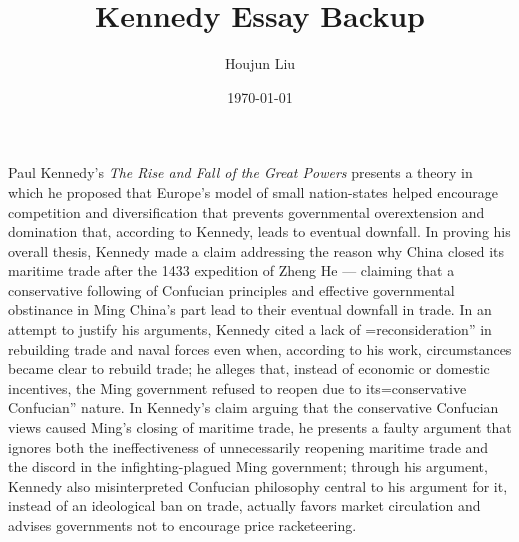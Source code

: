 \documentclass[letterpaper]{article}
\author{Houjun Liu}
\date{\today}
\title{Kennedy Essay Backup}
\renewcommand{\tableofcontents}{}
\begin{document}
\tableofcontents

Paul Kennedy's \textit{The Rise and Fall of the Great Powers} presents a
theory in which he proposed that Europe's model of small nation-states
helped encourage competition and diversification that prevents
governmental overextension and domination that, according to Kennedy,
leads to eventual downfall. In proving his overall thesis, Kennedy made
a claim addressing the reason why China closed its maritime trade after
the 1433 expedition of Zheng He --- claiming that a conservative
following of Confucian principles and effective governmental obstinance
in Ming China's part lead to their eventual downfall in trade. In an
attempt to justify his arguments, Kennedy cited a lack of
=reconsideration'' in rebuilding trade and naval forces even when, according to his work, circumstances became clear to rebuild trade; he alleges that, instead of economic or domestic incentives, the Ming government refused to reopen due to its=conservative
Confucian'' nature. In Kennedy's claim arguing that the conservative
Confucian views caused Ming's closing of maritime trade, he presents a
faulty argument that ignores both the ineffectiveness of unnecessarily
reopening maritime trade and the discord in the infighting-plagued Ming
government; through his argument, Kennedy also misinterpreted Confucian
philosophy central to his argument for it, instead of an ideological ban
on trade, actually favors market circulation and advises governments not
to encourage price racketeering.
\end{document}
